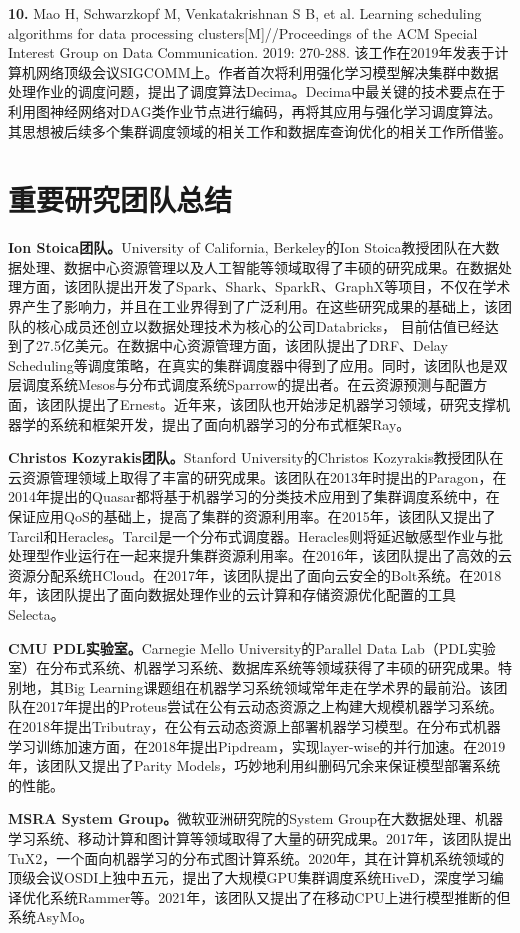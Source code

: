 \textbf{10. }Mao H, Schwarzkopf M, Venkatakrishnan S B, et al. Learning scheduling algorithms for data processing clusters[M]//Proceedings of the ACM Special Interest Group on Data Communication. 2019: 270-288. 该工作在2019年发表于计算机网络顶级会议SIGCOMM上。作者首次将利用强化学习模型解决集群中数据处理作业的调度问题，提出了调度算法Decima。Decima中最关键的技术要点在于利用图神经网络对DAG类作业节点进行编码，再将其应用与强化学习调度算法。其思想被后续多个集群调度领域的相关工作和数据库查询优化的相关工作\parencite{47669,marcus2019neo}所借鉴。


\section{重要研究团队总结}
\textbf{Ion Stoica团队。}University of California, Berkeley的Ion Stoica教授团队在大数据处理、数据中心资源管理以及人工智能等领域取得了丰硕的研究成果。在数据处理方面，该团队提出开发了Spark、Shark、SparkR、GraphX等项目，不仅在学术界产生了影响力，并且在工业界得到了广泛利用。在这些研究成果的基础上，该团队的核心成员还创立以数据处理技术为核心的公司Databricks， 目前估值已经达到了27.5亿美元。在数据中心资源管理方面，该团队提出了DRF、Delay Scheduling等调度策略，在真实的集群调度器中得到了应用。同时，该团队也是双层调度系统Mesos与分布式调度系统Sparrow的提出者。在云资源预测与配置方面，该团队提出了Ernest。近年来，该团队也开始涉足机器学习领域，研究支撑机器学的系统和框架开发，提出了面向机器学习的分布式框架Ray。

\textbf{Christos Kozyrakis团队。}Stanford University的Christos Kozyrakis教授团队在云资源管理领域上取得了丰富的研究成果。该团队在2013年时提出的Paragon，在2014年提出的Quasar都将基于机器学习的分类技术应用到了集群调度系统中，在保证应用QoS的基础上，提高了集群的资源利用率。在2015年，该团队又提出了Tarcil和Heracles。Tarcil是一个分布式调度器。Heracles则将延迟敏感型作业与批处理型作业运行在一起来提升集群资源利用率。在2016年，该团队提出了高效的云资源分配系统HCloud。在2017年，该团队提出了面向云安全的Bolt系统。在2018年，该团队提出了面向数据处理作业的云计算和存储资源优化配置的工具Selecta。

\textbf{CMU PDL实验室。}Carnegie Mello University的Parallel Data Lab（PDL实验室）在分布式系统、机器学习系统、数据库系统等领域获得了丰硕的研究成果。特别地，其Big Learning课题组在机器学习系统领域常年走在学术界的最前沿。该团队在2017年提出的Proteus尝试在公有云动态资源之上构建大规模机器学习系统。在2018年提出Tributray，在公有云动态资源上部署机器学习模型。在分布式机器学习训练加速方面，在2018年提出Pipdream，实现layer-wise的并行加速。在2019年，该团队又提出了Parity Models，巧妙地利用纠删码冗余来保证模型部署系统的性能。

\textbf{MSRA System Group。}微软亚洲研究院的System Group在大数据处理、机器学习系统、移动计算和图计算等领域取得了大量的研究成果。2017年，该团队提出TuX2，一个面向机器学习的分布式图计算系统。2020年，其在计算机系统领域的顶级会议OSDI上独中五元，提出了大规模GPU集群调度系统HiveD，深度学习编译优化系统Rammer等。2021年，该团队又提出了在移动CPU上进行模型推断的但系统AsyMo。